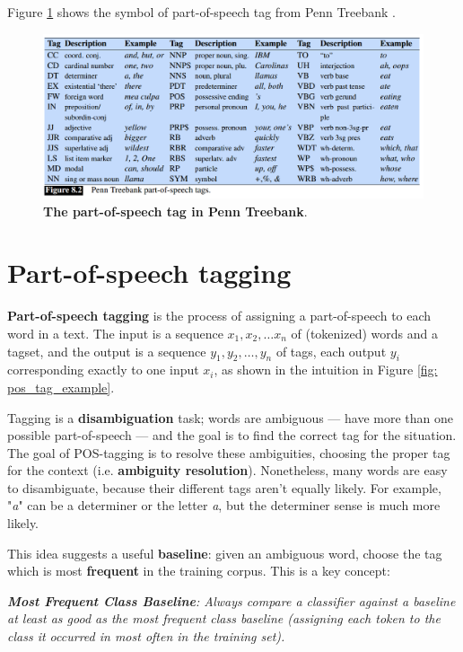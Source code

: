 \documentclass[11pt]{article}
\begin{document}
Figure \ref{fig: pos_tag} shows the symbol of part-of-speech tag from Penn Treebank \citep{jurafsky2014speech}. 
\begin{figure}
\begin{minipage}[t]{1\linewidth}
  \centering
  \centerline{\includegraphics[scale = 0.4]{pos_tag.png}}
\end{minipage}
\caption{\footnotesize{\textbf{The part-of-speech tag in Penn Treebank}.}}
\label{fig: pos_tag}
\end{figure}

\section{Part-of-speech tagging}
\textbf{Part-of-speech tagging} is the process of assigning a part-of-speech to each word in a text. The input is a sequence $x_1, x_2, \ldots x_n$ of (tokenized) words and a tagset, and the output is a sequence $y_1, y_2, \ldots, y_n$ of tags, each output $y_i$ corresponding exactly to one input $x_i$, as shown in the intuition in Figure \ref{fig: pos_tag_example}. 

Tagging is a \textbf{disambiguation} task; words are ambiguous — have more than one possible part-of-speech — and the goal is to find the correct tag for the situation. The goal of POS-tagging is to resolve these ambiguities, choosing the proper tag for the context (i.e. \textbf{ambiguity resolution}). Nonetheless, many words are easy to disambiguate, because their different tags aren’t equally likely. For example, "\emph{a}" can be a determiner or the letter \emph{a}, but the determiner sense is much more likely. 

This idea suggests a useful \textbf{baseline}: given an ambiguous word, choose the tag which is most \textbf{frequent} in the training corpus. This is a key concept:

\emph{\textbf{Most Frequent Class Baseline}: Always compare a classifier against a baseline at least as good as the most frequent class baseline (assigning each token to the class it occurred in most often in the training set).}
\end{document}
